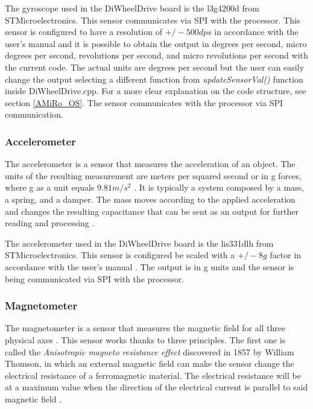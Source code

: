 \documentclass[12pt]{report}%
\begin{document}
The gyroscope used in the DiWheelDrive board is the l3g4200d from STMicroelectronics. This sensor communicates via SPI with the processor. This sensor is configured to have a resolution of $+/-500 dps$ in accordance with the user's manual \cite{gyroscopepart} and it is possible to obtain the output in degrees per second, micro degrees per second, revolutions per second, and micro revolutions per second with the current code. The actual units are degrees per second but the user can easily change the output selecting a different function from \textit{updateSensorVal()} function inside DiWheelDrive.cpp. For a more clear explanation on the code structure, see section \ref{AMiRo_OS}. The sensor communicates with the processor via SPI communication.

\subsubsection{Accelerometer}
The accelerometer is a sensor that measures the acceleration of an object. The units of the resulting measurement are meters per squared second or in g forces, where g as a unit equals $9.81 m/s^2$ \cite{accelerometertheory}. It is typically a system composed by a mass, a spring, and a damper. The mass moves according to the applied acceleration and changes the resulting capacitance that can be sent as an output for further reading and processing \cite{AMiRo_ppt_v1}.

The accelerometer used in the DiWheelDrive board is the lis331dlh from STMicroelectronics. This sensor is configured be scaled with a $+/-8g$ factor in accordance with the user's manual \cite{accelerometerpart}. The output is in g units and the sensor is being communicated via SPI with the processor.

\subsubsection{Magnetometer}
The magnetometer is a sensor that measures the magnetic field for all three physical axes \cite{magnetometertheory}. This sensor works thanks to three principles. The first one is called the \textit{Anisotropic magneto resistance effect} discovered in 1857 by William Thomson, in which an external magnetic field can make the sensor change the electrical resistance of a ferromagnetic material. The electrical resistance will be at a maximum value when the direction of the electrical current is parallel to said magnetic field \cite{AMiRo_ppt_v1}.
\end{document}
